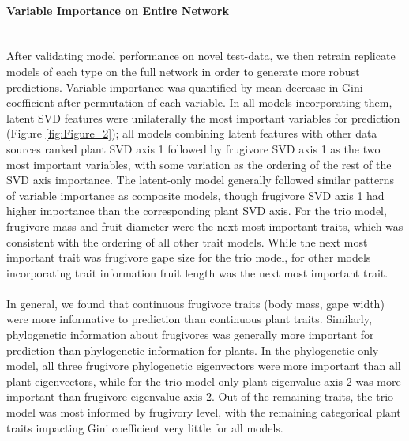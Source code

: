 \paragraph{Variable Importance on Entire Network}\mbox{}\\ 
After validating model performance on novel test-data, we then retrain replicate models of each type on the full network in order to generate more robust predictions. Variable importance was quantified by mean decrease in Gini coefficient after permutation of each variable. In all models incorporating them, latent SVD features were unilaterally the most important variables for prediction (Figure \ref{fig:Figure_2}); all models combining latent features with other data sources ranked plant SVD axis 1 followed by frugivore SVD axis 1 as the two most important variables, with some variation as the ordering of the rest of the SVD axis importance. The latent-only model generally followed similar patterns of variable importance as composite models, though frugivore SVD axis 1 had higher importance than the corresponding plant SVD axis. For the trio model, frugivore mass and fruit diameter were the next most important traits, which was consistent with the ordering of all other trait models. While the next most important trait was frugivore gape size for the trio model, for other models incorporating trait information fruit length was the next most important trait. 

\paragraph*{}
In general, we found that continuous frugivore traits (body mass, gape width) were more informative to prediction than continuous plant traits. Similarly, phylogenetic information about frugivores was generally more important for prediction than phylogenetic information for plants. In the phylogenetic-only model, all three frugivore phylogenetic eigenvectors were more important than all plant eigenvectors, while for the trio model only plant eigenvalue axis 2 was more important than frugivore eigenvalue axis 2. Out of the remaining traits, the trio model was most informed by frugivory level, with the remaining categorical plant traits impacting Gini coefficient very little for all models. 


